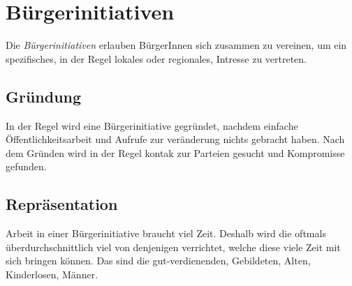 \documentclass{article}
\begin{document}
\section{Bürgerinitiativen}
Die \emph{Bürgerinitiativen} erlauben BürgerInnen sich zusammen zu vereinen, um ein spezifisches, in der Regel lokales oder regionales, Intresse zu vertreten.
 
\subsection{Gründung} 
In der Regel wird eine Bürgerinitiative gegründet, nachdem einfache Öffentlichkeitsarbeit und Aufrufe zur veränderung nichts gebracht haben. Nach dem Gründen wird in der Regel kontak zur Parteien gesucht und Kompromisse gefunden.
 
\subsection{Repräsentation} 
Arbeit in einer Bürgerinitiative braucht viel Zeit. Deshalb wird die oftmals überdurchschnittlich viel von denjenigen verrichtet, welche diese viele Zeit mit sich bringen können. Das sind die gut-verdienenden, Gebildeten, Alten, Kinderlosen, Männer. 
\end{document}

